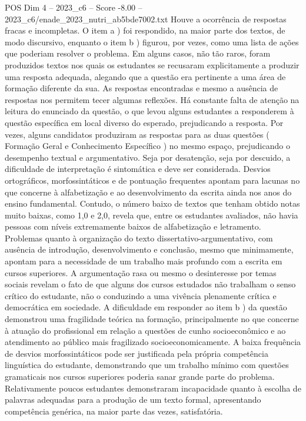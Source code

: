 \begin{textsample}{POS Dim 4 – 2023\_c6 – Score -8.00 – 2023\_c6/enade\_2023\_nutri\_ab5bde7002.txt}
Houve a ocorrência de respostas fracas e incompletas.
O item a ) foi respondido, na maior parte dos textos, de modo discursivo, enquanto o item b ) figurou, por vezes, como uma lista de ações que poderiam resolver o problema.
Em alguns casos, não tão raros, foram produzidos textos nos quais os estudantes se recusaram explicitamente a produzir uma resposta adequada, alegando que a questão era pertinente a uma área de formação diferente da sua.
As respostas encontradas e mesmo a ausência de respostas nos permitem tecer algumas reflexões.
Há constante falta de atenção na leitura do enunciado da questão, o que levou alguns estudantes a responderem à questão específica em local diverso do esperado, prejudicando a resposta.
Por vezes, alguns candidatos produziram as respostas para as duas questões ( Formação Geral e Conhecimento Específico ) no mesmo espaço, prejudicando o desempenho textual e argumentativo.
Seja por desatenção, seja por descuido, a dificuldade de interpretação é sintomática e deve ser considerada.
Desvios ortográficos, morfossintáticos e de pontuação frequentes apontam para lacunas no que concerne à alfabetização e ao desenvolvimento da escrita ainda nos anos do ensino fundamental.
Contudo, o número baixo de textos que tenham obtido notas muito baixas, como 1,0 e 2,0, revela que, entre os estudantes avaliados, não havia pessoas com níveis extremamente baixos de alfabetização e letramento.
Problemas quanto à organização do texto dissertativo-argumentativo, com ausência de introdução, desenvolvimento e conclusão, mesmo que minimamente, apontam para a necessidade de um trabalho mais profundo com a escrita em cursos superiores.
A argumentação rasa ou mesmo o desinteresse por temas sociais revelam o fato de que alguns dos cursos estudados não trabalham o senso crítico do estudante, não o conduzindo a uma vivência plenamente crítica e democrática em sociedade.
A dificuldade em responder ao item b ) da questão demonstrou uma fragilidade teórica na formação, principalmente no que concerne à atuação do profissional em relação a questões de cunho socioeconômico e ao atendimento ao público mais fragilizado socioeconomicamente.
A baixa frequência de desvios morfossintáticos pode ser justificada pela própria competência linguística do estudante, demonstrando que um trabalho mínimo com questões gramaticais nos cursos superiores poderia sanar grande parte do problema.
Relativamente poucos estudantes demonstraram incapacidade quanto à escolha de palavras adequadas para a produção de um texto formal, apresentando competência genérica, na maior parte das vezes, satisfatória.

\end{textsample}
